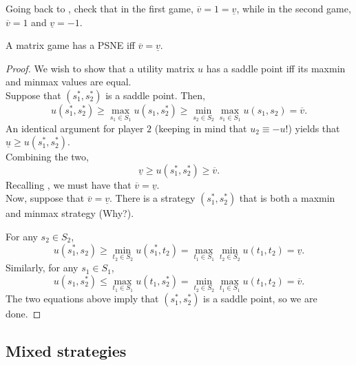 	Going back to , check that in the first game, $\overline{v} = 1 = \underline{v}$, while in the second game, $\overline{v} = 1$ and $\underline{v} = -1$.

	\begin{ftheo}
		A matrix game has a PSNE iff $\overline{v} = \underline{v}$.
	\end{ftheo}
	\begin{proof}
		We wish to show that a utility matrix $u$ has a saddle point iff its maxmin and minmax values are equal.\\
		
		Suppose that $(s_1^*,s_2^*)$ is a saddle point. Then,
		\[ u(s_1^*,s_2^*) \ge \max_{s_1 \in S_1} u(s_1,s_2^*) \ge \min_{s_2 \in S_2} \max_{s_1 \in S_1} u(s_1,s_2) = \overline{v}. \]
		An identical argument for player $2$ (keeping in mind that $u_2 \equiv -u$!) yields that $\underline{u} \ge u(s_1^*,s_2^*)$.\\
		Combining the two,
		\[ \underline{v} \ge u(s_1^*,s_2^*) \ge \overline{v}. \]
		Recalling , we must have that $\overline{v} = \underline{v}$.\\

		Now, suppose that $\overline{v} = \underline{v}$. There is a strategy $(s_1^*,s_2^*)$ that is both a maxmin and minmax strategy (Why?).

		For any $s_2 \in S_2$,
		\[ u(s_1^*,s_2) \ge \min_{t_2 \in S_2} u(s_1^*,t_2) = \max_{t_1 \in S_1} \min_{t_2 \in S_2} u(t_1,t_2) = \underline{v}. \]
		Similarly, for any $s_1 \in S_1$,
		\[ u(s_1,s_2^*) \le \max_{t_1 \in S_1} u(t_1,s_2^*) = \min_{t_2 \in S_2} \max_{t_1 \in S_1} u(t_1,t_2) = \overline{v}. \]
		The two equations above imply that $(s_1^*,s_2^*)$ is a saddle point, so we are done.
	\end{proof}

\subsection{Mixed strategies}

